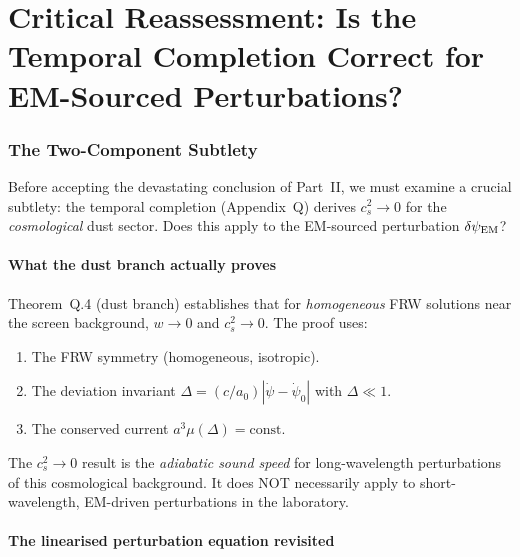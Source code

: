 \documentclass[11pt]{article}
\newcommand{\dpsiEM}{\delta\psi_{\rm EM}}
\theoremstyle{definition}
\theoremstyle{remark}
\begin{document}
\part{Critical Reassessment: Is the Temporal Completion Correct for
  EM-Sourced Perturbations?}
\label{part:reassessment}


\section{The Two-Component Subtlety}
\label{sec:two-component}

Before accepting the devastating conclusion of Part~II, we must examine
a crucial subtlety: the temporal completion (Appendix~Q) derives
$c_s^2 \to 0$ for the \emph{cosmological} dust sector. Does this
apply to the EM-sourced perturbation $\dpsiEM$?

\subsection{What the dust branch actually proves}

Theorem~Q.4 (dust branch) establishes that for \emph{homogeneous}
FRW solutions near the screen background, $w \to 0$ and $c_s^2 \to 0$.
The proof uses:
\begin{enumerate}[nosep]
\item The FRW symmetry (homogeneous, isotropic).
\item The deviation invariant $\Delta = (c/a_0)|\dot\psi - \dot\psi_0|$
  with $\Delta \ll 1$.
\item The conserved current $a^3 \mu(\Delta) = \text{const}$.
\end{enumerate}

The $c_s^2 \to 0$ result is the \emph{adiabatic sound speed} for
long-wavelength perturbations of this cosmological background. It
does NOT necessarily apply to short-wavelength, EM-driven perturbations
in the laboratory.

\subsection{The linearised perturbation equation revisited}
\end{document}
